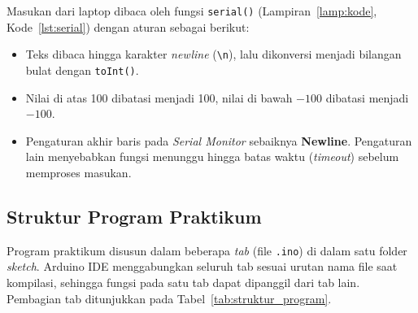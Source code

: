 \documentclass[11pt,a4paper]{article}
\begin{document}
Masukan dari laptop dibaca oleh fungsi \texttt{serial()} (Lampiran~\ref{lamp:kode}, Kode~\ref{lst:serial}) dengan aturan sebagai berikut:
\begin{itemize}
	\item Teks dibaca hingga karakter \textit{newline} (\texttt{\textbackslash n}), lalu dikonversi menjadi bilangan bulat dengan \texttt{toInt()}.
	\item Nilai di atas 100 dibatasi menjadi 100, nilai di bawah $-100$ dibatasi menjadi $-100$.
	\item Pengaturan akhir baris pada \textit{Serial Monitor} sebaiknya \textbf{Newline}. Pengaturan lain menyebabkan fungsi menunggu hingga batas waktu (\textit{timeout}) sebelum memproses masukan.
\end{itemize}

\subsection{Struktur Program Praktikum}
Program praktikum disusun dalam beberapa \textit{tab} (file \texttt{.ino}) di dalam satu folder \textit{sketch}. Arduino IDE menggabungkan seluruh tab sesuai urutan nama file saat kompilasi, sehingga fungsi pada satu tab dapat dipanggil dari tab lain. Pembagian tab ditunjukkan pada Tabel~\ref{tab:struktur_program}.
\end{document}
